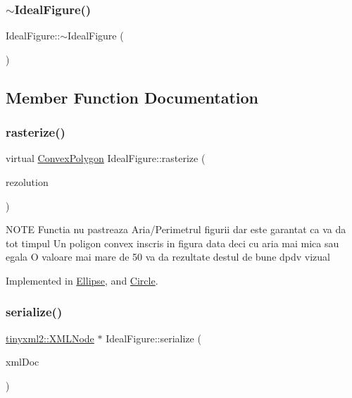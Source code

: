 \subsubsection{\texorpdfstring{$\sim$\+Ideal\+Figure()}{~IdealFigure()}}
{\footnotesize\ttfamily Ideal\+Figure\+::$\sim$\+Ideal\+Figure (\begin{DoxyParamCaption}{ }\end{DoxyParamCaption})\hspace{0.3cm}{\ttfamily [inline]}}



\subsection{Member Function Documentation}
\mbox{\label{class_ideal_figure_ae1b50ae419aa258fb7ebc7131e3d4a5d}} 
\subsubsection{\texorpdfstring{rasterize()}{rasterize()}}
{\footnotesize\ttfamily virtual \hyperlink{class_convex_polygon}{Convex\+Polygon} Ideal\+Figure\+::rasterize (\begin{DoxyParamCaption}\item[{unsigned}]{rezolution }\end{DoxyParamCaption})\hspace{0.3cm}{\ttfamily [pure virtual]}}

N\+O\+TE Functia nu pastreaza Aria/\+Perimetrul figurii dar este garantat ca va da tot timpul Un poligon convex inscris in figura data deci cu aria mai mica sau egala O valoare mai mare de 50 va da rezultate destul de bune dpdv vizual 

Implemented in \hyperlink{class_ellipse_a54a8e6dab13f9d3a0cc633101e2ce6d6}{Ellipse}, and \hyperlink{class_circle_ae5f140e34baceae51bb662bc15a5cecc}{Circle}.

\mbox{\label{class_ideal_figure_a5a795a3de8992af3fb9cee4a904b31a5}} 
\subsubsection{\texorpdfstring{serialize()}{serialize()}}
{\footnotesize\ttfamily \hyperlink{classtinyxml2_1_1_x_m_l_node}{tinyxml2\+::\+X\+M\+L\+Node} $\ast$ Ideal\+Figure\+::serialize (\begin{DoxyParamCaption}\item[{\hyperlink{classtinyxml2_1_1_x_m_l_document}{tinyxml2\+::\+X\+M\+L\+Document} \&}]{xml\+Doc }\end{DoxyParamCaption})\hspace{0.3cm}{\ttfamily [virtual]}}



